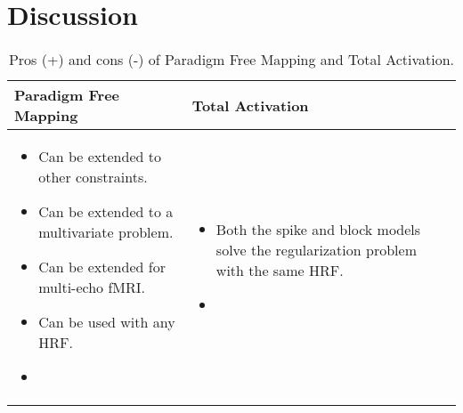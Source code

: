 \section{Discussion}

\newcommand\pro{\item[$+$]}
\newcommand\con{\item[$-$]}


\begin{table}
    \centering
    \begin{tabular}{ m{4cm} m{4cm} }
        Paradigm Free Mapping & Total Activation \\
        \toprule
        \begin{itemize}
            \pro Can be extended to other constraints.
            \pro Can be extended to a multivariate problem.
            \pro Can be extended for multi-echo fMRI.
            \pro Can be used with any HRF.
            \con 
        \end{itemize} &
        \begin{itemize}
            \pro Both the spike and block models solve the regularization problem with the same HRF.
            \con 
        \end{itemize} \\
    \end{tabular}
    \caption{Pros (+) and cons (-) of Paradigm Free Mapping and Total Activation.}
\end{table}

